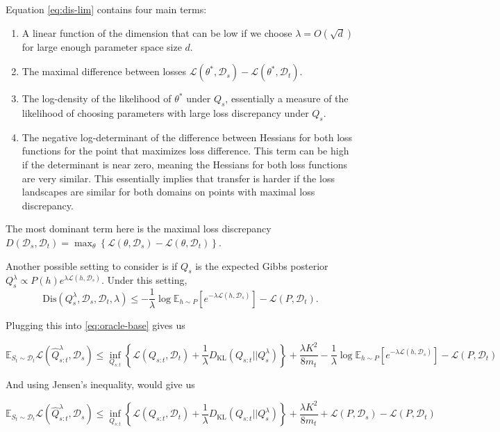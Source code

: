 \documentclass[letterpaper]{article}
\theoremstyle{definition}
\begin{document}
Equation \eqref{eq:dis-lim} contains four main terms:
\begin{enumerate}
	\item A linear function of the dimension that can be low if we choose $\lambda=O(\sqrt{d})$ for large enough parameter space size $d$.
	\item The maximal difference between losses $\mathcal{L}(\theta^*, \mathcal{D}_s)-\mathcal{L}(\theta^*, \mathcal{D}_t)$.
	\item The log-density of the likelihood of $\theta^*$ under $Q_s$, essentially a measure of the likelihood of choosing parameters with large loss discrepancy under $Q_s$.
	\item The negative log-determinant of the difference between Hessians for both loss functions for the point that maximizes loss difference. This term can be high if the determinant is near zero, meaning the Hessians for both loss functions are very similar. This essentially implies that transfer is harder if the loss landscapes are similar for both domains on points with maximal loss discrepancy.
\end{enumerate}

The most dominant term here is the maximal loss discrepancy $D(\mathcal{D}_s, \mathcal{D}_t)=\max_{\theta}\left \{\mathcal{L}(\theta, \mathcal{D}_s)-\mathcal{L}(\theta, \mathcal{D}_t) \right \}$.


Another possible setting to consider is if $Q_s$ is the expected Gibbs posterior $Q^{\lambda}_{s}\propto P(h)e^{\lambda\mathcal{L}(h,\mathcal{D}_s)}$. Under this setting, $$\mathrm{Dis}(Q^{\lambda}_{s},\mathcal{D}_s, \mathcal{D}_t, \lambda )\leq -\frac{1}{\lambda}\log\mathbb{E}_{h\sim P}\left [e^{-\lambda\mathcal{L}(h,\mathcal{D}_s)} \right ]-\mathcal{L}(P,\mathcal{D}_t).$$

Plugging this into \eqref{eq:oracle-base} gives us

$$
\mathbb{E}_{S_t\sim \mathcal{D}_t}\mathcal{L}( \hat{Q}^{\lambda}_{s:t},\mathcal{D}_s)\leq \inf_{Q_{s:t}}\left \{ \mathcal{L}(Q_{s:t},\mathcal{D}_t) + \frac{1}{\lambda}D_{\mathrm{KL}}(Q_{s:t}||Q^{\lambda}_{s}) \right \}+\frac{\lambda K^2}{8m_t}-\frac{1}{\lambda}\log\mathbb{E}_{h\sim P}\left [e^{-\lambda\mathcal{L}(h,\mathcal{D}_s)} \right ]-\mathcal{L}(P,\mathcal{D}_t)
$$

And using Jensen's inequality, would give us

$$
\mathbb{E}_{S_t\sim \mathcal{D}_t}\mathcal{L}( \hat{Q}^{\lambda}_{s:t},\mathcal{D}_s)\leq \inf_{Q_{s:t}}\left \{ \mathcal{L}(Q_{s:t},\mathcal{D}_t) + \frac{1}{\lambda}D_{\mathrm{KL}}(Q_{s:t}||Q^{\lambda}_{s}) \right \}+\frac{\lambda K^2}{8m_t}+\mathcal{L}(P,\mathcal{D}_s)-\mathcal{L}(P,\mathcal{D}_t)
$$
\end{document}
